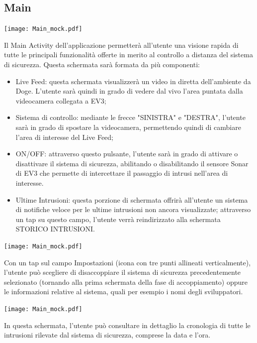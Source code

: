 \documentclass{article}
\begin{document}
\subsection{Main}

\begin{center}
\texttt{[image: Main\_mock.pdf]}
\end{center}

Il Main Activity dell'applicazione permetterà all'utente una visione rapida di tutte le principali funzionalità offerte in merito al controllo a distanza del sistema di sicurezza. Questa schermata sarà formata da più componenti:

\begin{itemize}
    \item Live Feed: questa schermata visualizzerà un video in diretta dell'ambiente da Doge. L'utente sarà quindi in grado di vedere dal vivo l'area puntata dalla videocamera collegata a EV3;
    \item Sistema di controllo: mediante le frecce "SINISTRA" e "DESTRA", l'utente sarà in grado di spostare la videocamera, permettendo quindi di cambiare l'area di interesse del Live Feed;
    \item ON/OFF: attraverso questo pulsante, l'utente sarà in grado di attivare o disattivare il sistema di sicurezza, abilitando o disabilitando il sensore Sonar di EV3 che permette di intercettare il passaggio di intrusi nell'area di interesse.
    \item Ultime Intrusioni: questa porzione di schermata offrirà all'utente un sistema di notifiche veloce per le ultime intrusioni non ancora visualizzate; attraverso un tap su questo campo, l'utente verrà reindirizzato alla schermata STORICO INTRUSIONI.
\end{itemize}

\begin{center}
\texttt{[image: Main\_mock.pdf]}
\end{center}
Con un tap sul campo Impostazioni (icona con tre punti allineati verticalmente), l'utente può scegliere di disaccoppiare il sistema di sicurezza precedentemente selezionato (tornando alla prima schermata della fase di accoppiamento) oppure le informazioni relative al sistema, quali per esempio i nomi degli sviluppatori.

\begin{center}
\texttt{[image: Main\_mock.pdf]}
\end{center}
In questa schermata, l'utente può consultare in dettaglio la cronologia di tutte le intrusioni rilevate dal sistema di sicurezza, comprese la data e l'ora.
\end{document}
